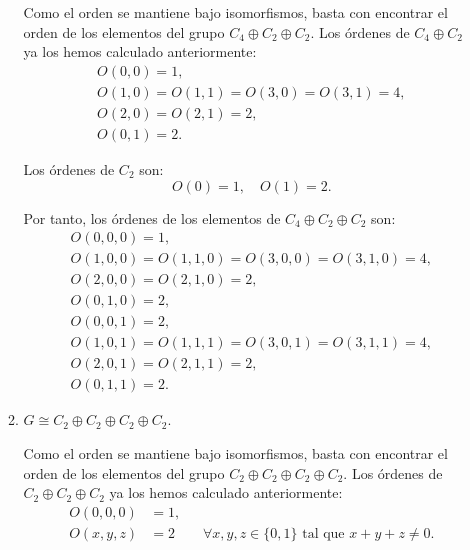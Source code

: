 \begin{ejercicio}
\begin{enumerate}
\begin{enumerate}
            Como el orden se mantiene bajo isomorfismos, basta con encontrar el orden de los elementos del grupo $C_4\oplus C_2 \oplus C_2$. Los órdenes de $C_4\oplus C_2$ ya los hemos calculado anteriormente:
            \begin{gather*}
                O(0, 0) = 1, \\
                O(1, 0) = O(1,1) = O(3, 0) = O(3, 1) = 4, \\
                O(2, 0) = O(2, 1) = 2, \\
                O(0, 1) = 2.
            \end{gather*}

            Los órdenes de $C_2$ son:
            \begin{equation*}
                O(0) = 1, \quad O(1) = 2.
            \end{equation*}

            Por tanto, los órdenes de los elementos de $C_4 \oplus C_2 \oplus C_2$ son:
            \begin{gather*}
                O(0, 0, 0) = 1, \\
                O(1, 0, 0) = O(1, 1, 0) = O(3, 0, 0) = O(3, 1, 0) = 4, \\
                O(2, 0, 0) = O(2, 1, 0) = 2, \\
                O(0, 1, 0) = 2, \\
                O(0, 0, 1) = 2, \\
                O(1, 0, 1) = O(1, 1, 1) = O(3, 0, 1) = O(3, 1, 1) = 4, \\
                O(2, 0, 1) = O(2, 1, 1) = 2, \\
                O(0, 1, 1) = 2.
            \end{gather*}
            
            \item $G \cong C_2 \oplus C_2 \oplus C_2 \oplus C_2$.
            
            Como el orden se mantiene bajo isomorfismos, basta con encontrar el orden de los elementos del grupo $C_2\oplus C_2 \oplus C_2 \oplus C_2$. Los órdenes de $C_2\oplus C_2 \oplus C_2$ ya los hemos calculado anteriormente:
            \begin{align*}
                O(0, 0, 0) &= 1, \\
                O(x, y, z) &= 2 \qquad \forall x,y,z \in \{0,1\} \text{ tal que } x+y+z \neq 0.
            \end{align*}


\end{enumerate}
\end{enumerate}
\end{ejercicio}
